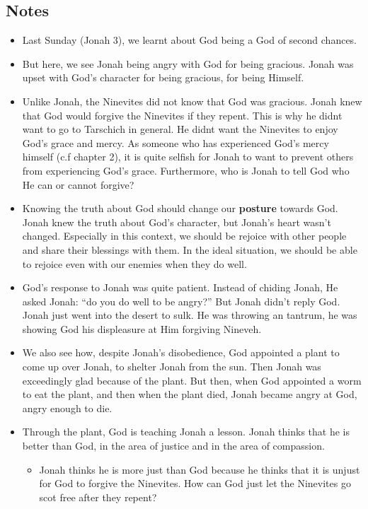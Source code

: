 \subsection*{Notes}
\begin{itemize}
  \item{Last Sunday (Jonah 3), we learnt about God being a God of second chances.}
  \item{But here, we see Jonah being angry with God for being gracious. Jonah was upset with God’s character for being gracious, for being Himself.}
  \item{Unlike Jonah, the Ninevites did not know that God was gracious. Jonah knew that God would forgive the Ninevites if they repent. This is why he didnt want to go to Tarschich in general. He didnt want the Ninevites to enjoy God’s grace and mercy. As someone who has experienced God’s mercy himself (c.f chapter 2), it is quite selfish for Jonah to want to prevent others from experiencing God’s grace. Furthermore, who is Jonah to tell God who He can or cannot forgive?}
  \item{Knowing the truth about God should change our \textbf{posture} towards God. Jonah knew the truth about God’s character, but Jonah’s heart wasn’t changed. Especially in this context, we should be rejoice with other people and share their blessings with them. In the ideal situation, we should be able to rejoice even with our enemies when they do well.}
  \item{God’s response to Jonah was quite patient. Instead of chiding Jonah, He asked Jonah: “do you do well to be angry?” But Jonah didn’t reply God. Jonah just went into the desert to sulk. He was throwing an tantrum, he was showing God his displeasure at Him forgiving Nineveh.}
  \item{We also see how, despite Jonah’s disobedience, God appointed a plant to come up over Jonah, to shelter Jonah from the sun. Then Jonah was exceedingly glad because of the plant. But then, when God appointed a worm to eat the plant, and then when the plant died, Jonah became angry at God, angry enough to die.}
  \item{Through the plant, God is teaching Jonah a lesson. Jonah thinks that he is better than God, in the area of justice and in the area of compassion.
  \begin{itemize}
    \item{Jonah thinks he is more just than God because he thinks that it is unjust for God to forgive the Ninevites. How can God just let the Ninevites go scot free after they repent?}

\end{itemize}}
\end{itemize}
